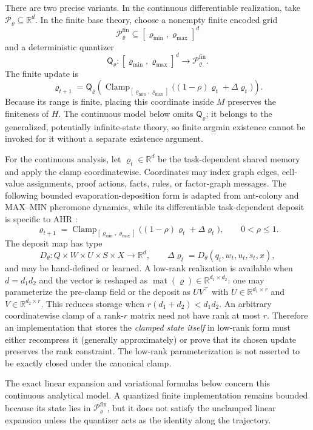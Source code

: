 \documentclass[11pt,oneside]{book}
\theoremstyle{remark}
\DeclareMathOperator{\Clamp}{Clamp}
\begin{document}
There are two precise variants. In the continuous differentiable
realization, take
$\mathcal P_{\varrho}\subseteq\mathbb R^d$. In the finite base theory, choose
a nonempty finite encoded grid
\[
\mathcal P_{\varrho}^{\mathrm{fin}}
\subseteq[\varrho_{\min},\varrho_{\max}]^d
\]
and a deterministic quantizer
\[
\mathsf Q_{\varrho}:
[\varrho_{\min},\varrho_{\max}]^d
\to\mathcal P_{\varrho}^{\mathrm{fin}}.
\]
The finite update is
\[
\varrho_{t+1}
=\mathsf Q_{\varrho}\!\left(
\Clamp_{[\varrho_{\min},\varrho_{\max}]}
\bigl((1-\rho)\varrho_t+\Delta\varrho_t\bigr)\right).
\]
Because its range is finite, placing this coordinate inside $M$ preserves the
finiteness of $H$. The continuous model below omits $\mathsf Q_{\varrho}$; it
belongs to the generalized, potentially infinite-state theory, so finite
argmin existence cannot be invoked for it without a separate existence
argument.

For the continuous analysis, let $\varrho_t\in\mathbb R^d$ be the
task-dependent shared memory and apply the clamp coordinatewise. Coordinates
may index graph edges, cell-value assignments, proof actions, facts, rules, or
factor-graph messages. The following bounded evaporation-deposition form is
adapted from ant-colony and MAX--MIN pheromone dynamics, while its
differentiable task-dependent deposit is specific to AHR
\cite{DorigoACO1996,DorigoGambardella1997,StutzleHoos2000,DorigoStutzle2004}:
\[
\varrho_{t+1}=\Clamp_{[\varrho_{\min},\varrho_{\max}]}
\bigl((1-\rho)\varrho_t+\Delta\varrho_t\bigr),
\qquad 0<\rho\le1.
\]
The deposit map has type
\[
D_\theta:Q\times W\times U\times S\times X\to\mathbb R^d,
\qquad
\Delta\varrho_t=D_\theta(q_t,w_t,u_t,s_t,x),
\]
and may be hand-defined or learned. A low-rank realization
is available when $d=d_1d_2$ and the vector is reshaped as
$\operatorname{mat}(\varrho)\in\mathbb R^{d_1\times d_2}$: one may parameterize
the pre-clamp field or the deposit as $UV^\top$ with
$U\in\mathbb R^{d_1\times r}$ and
$V\in\mathbb R^{d_2\times r}$. This reduces storage when
$r(d_1+d_2)<d_1d_2$. An arbitrary coordinatewise clamp of a rank-$r$ matrix
need not have rank at most $r$. Therefore an implementation that stores the
\emph{clamped state itself} in low-rank form must either recompress it
(generally approximately) or prove that its chosen update preserves the rank
constraint. The low-rank parameterization is not asserted to be exactly
closed under the canonical clamp.

The exact linear expansion and variational formulas below concern this
continuous analytical model. A quantized finite implementation remains
bounded because its state lies in
$\mathcal P_{\varrho}^{\mathrm{fin}}$, but it does not satisfy the unclamped
linear expansion unless the quantizer acts as the identity along the
trajectory.
\end{document}
